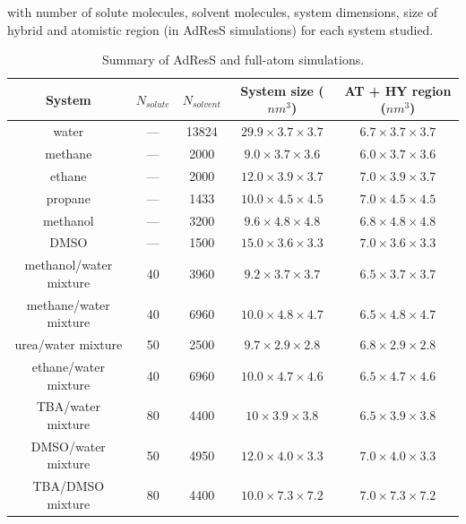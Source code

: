 \documentclass[a4paper,preprint,unsortedaddress]{revtex4-1}
\begin{document}
with number of solute molecules, solvent molecules, system dimensions, size of hybrid and atomistic region (in AdResS simulations)
for each system studied. 
\begin{table}[!ht]
\begin{center}
\begin{tabular}{ccccc}
\hline \hline
 System & $N_{solute}$ & $N_{solvent}$ & System size ($nm^{3}$) &  AT + HY region ($nm^{3}$)  \\
\hline
water    & --- & 13824 & $29.9 \times 3.7 \times 3.7$ & $6.7 \times 3.7 \times 3.7$ \\
methane & --- & 2000 & $9.0 \times  3.7 \times 3.6$ & $6.0 \times 3.7 \times 3.6$ \\
ethane & --- & 2000 & $12.0 \times 3.9 \times 3.7$ & $7.0 \times 3.9 \times 3.7$ \\
propane & --- & 1433 & $10.0 \times 4.5 \times 4.5$ & $7.0 \times 4.5 \times 4.5$ \\
methanol & --- & 3200 & $9.6 \times 4.8 \times 4.8$ & $6.8 \times 4.8 \times 4.8$ \\
DMSO & --- & 1500 & $15.0 \times 3.6 \times 3.3$ &  $7.0 \times 3.6 \times 3.3$ \\
methanol/water mixture & 40 & 3960 & $9.2 \times 3.7 \times 3.7$ & $6.5 \times 3.7 \times 3.7$ \\
methane/water mixture & 40  & 6960 & $10.0 \times 4.8 \times 4.7$ & $6.5 \times 4.8 \times 4.7$ \\
urea/water mixture & 50 & 2500 & $9.7 \times 2.9 \times 2.8$ & $6.8 \times 2.9 \times 2.8$ \\
ethane/water mixture & 40 & 6960 & $10.0 \times 4.7 \times 4.6$ & $6.5 \times 4.7 \times 4.6$ \\ 
TBA/water mixture & 80 & 4400 & $10 \times 3.9 \times 3.8$ & $6.5 \times 3.9 \times 3.8$  \\
DMSO/water mixture & 50 & 4950 & $12.0 \times 4.0 \times 3.3$ & $7.0 \times 4.0 \times 3.3$ \\
TBA/DMSO mixture & 80 & 4400 & $10.0 \times 7.3 \times 7.2$ &  $7.0 \times 7.3 \times 7.2$ \\
\hline \hline
\end{tabular}
\caption{Summary of AdResS and full-atom simulations.}
\label{table2}
\end{center}
\end{table}
\end{document}
